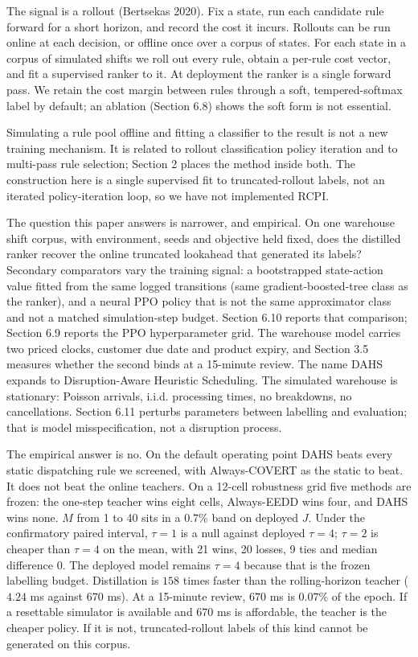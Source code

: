 \documentclass[review,3p,times]{elsarticle}
\newcounter{none}
\theoremstyle{definition}
\begin{document}
The signal is a rollout (Bertsekas 2020). Fix a state, run each
candidate rule forward for a short horizon, and record the cost it
incurs. Rollouts can be run online at each decision, or offline once
over a corpus of states. For each state in a corpus of simulated shifts
we roll out every rule, obtain a per-rule cost vector, and fit a
supervised ranker to it. At deployment the ranker is a single forward
pass. We retain the cost margin between rules through a soft,
tempered-softmax label by default; an ablation (Section 6.8) shows the
soft form is not essential.

Simulating a rule pool offline and fitting a classifier to the result is
not a new training mechanism. It is related to rollout classification
policy iteration and to multi-pass rule selection; Section 2 places the
method inside both. The construction here is a single supervised fit to
truncated-rollout labels, not an iterated policy-iteration loop, so we
have not implemented RCPI.

The question this paper answers is narrower, and empirical. On one
warehouse shift corpus, with environment, seeds and objective held
fixed, does the distilled ranker recover the online truncated lookahead
that generated its labels? Secondary comparators vary the training
signal: a bootstrapped state-action value fitted from the same logged
transitions (same gradient-boosted-tree class as the ranker), and a
neural PPO policy that is not the same approximator class and not a
matched simulation-step budget. Section 6.10 reports that comparison;
Section 6.9 reports the PPO hyperparameter grid. The warehouse model
carries two priced clocks, customer due date and product expiry, and
Section 3.5 measures whether the second binds at a 15-minute review. The
name DAHS expands to Disruption-Aware Heuristic Scheduling. The
simulated warehouse is stationary: Poisson arrivals, i.i.d. processing
times, no breakdowns, no cancellations. Section 6.11 perturbs parameters
between labelling and evaluation; that is model misspecification, not a
disruption process.

The empirical answer is no. On the default operating point DAHS beats
every static dispatching rule we screened, with Always-COVERT as the
static to beat. It does not beat the online teachers. On a 12-cell
robustness grid five methods are frozen: the one-step teacher wins eight
cells, Always-EEDD wins four, and DAHS wins none. \(M\) from 1 to 40
sits in a \(0.7\%\) band on deployed \(J\). Under the confirmatory
paired interval, \(\tau=1\) is a null against deployed \(\tau=4\);
\(\tau=2\) is cheaper than \(\tau=4\) on the mean, with 21 wins, 20
losses, 9 ties and median difference 0. The deployed model remains
\(\tau=4\) because that is the frozen labelling budget. Distillation is
\(158\) times faster than the rolling-horizon teacher (\(4.24\) ms
against \(670\) ms). At a 15-minute review, \(670\) ms is \(0.07\%\) of
the epoch. If a resettable simulator is available and \(670\) ms is
affordable, the teacher is the cheaper policy. If it is not,
truncated-rollout labels of this kind cannot be generated on this
corpus.
\end{document}

